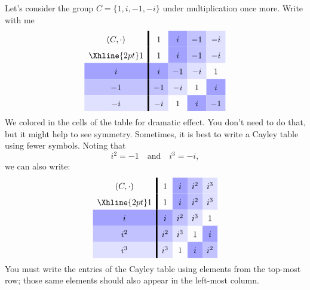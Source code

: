 \documentclass{ximera}
\begin{document}
\begin{example}
  Let's consider the group $C =\{1,i,-1,-i\}$ under multiplication once more.
  Write with me  
  \[
  \renewcommand{\arraystretch}{1.6}
  \begin{array}{c!{\vline width 2pt}cccccc}
    (C,\cdot)& 1     & i\cellcolor{blue!36!white}     & -1\cellcolor{blue!24!white}    & -i\cellcolor{blue!12!white}  \\  \Xhline{2pt}
    1        & 1     & i\cellcolor{blue!36!white}     & -1\cellcolor{blue!24!white}    & -i\cellcolor{blue!12!white}  \\  
    i\cellcolor{blue!36!white}        & i\cellcolor{blue!36!white}     & -1\cellcolor{blue!24!white}    & -i\cellcolor{blue!12!white}    & 1   \\  
    -1\cellcolor{blue!24!white}       & -1\cellcolor{blue!24!white}    & -i\cellcolor{blue!12!white}    & 1     & i\cellcolor{blue!36!white}   \\  
    -i\cellcolor{blue!12!white}       & -i\cellcolor{blue!12!white}    & 1     & i\cellcolor{blue!36!white}     & -1\cellcolor{blue!24!white}  
  \end{array}
  \]
  We colored in the cells of the table for dramatic effect. You don't
  need to do that, but it might help to see symmetry.  Sometimes, it
  is best to write a Cayley table using fewer symbols.  Noting that
  \[
  i^2 = -1 \quad\text{and}\quad i^3 = -i,
  \]
  we can also write:
  \[
  \renewcommand{\arraystretch}{1.6}
  \begin{array}{c!{\vline width 2pt}cccccc}
    (C,\cdot)& 1     & i\cellcolor{blue!36!white}     & i^2\cellcolor{blue!24!white}    & i^3\cellcolor{blue!12!white}  \\  \Xhline{2pt}
    1        & 1     & i\cellcolor{blue!36!white}     & i^2\cellcolor{blue!24!white}    & i^3\cellcolor{blue!12!white}  \\  
    i\cellcolor{blue!36!white}        & i\cellcolor{blue!36!white}     & i^2\cellcolor{blue!24!white}    & i^3\cellcolor{blue!12!white}    & 1   \\  
    i^2\cellcolor{blue!24!white}       & i^2\cellcolor{blue!24!white}    & i^3\cellcolor{blue!12!white}    & 1     & i\cellcolor{blue!36!white}   \\  
    i^3\cellcolor{blue!12!white}       & i^3\cellcolor{blue!12!white}    & 1     & i\cellcolor{blue!36!white}     & i^2\cellcolor{blue!24!white}  
  \end{array}
  \]
  You must write the entries of the Cayley table using elements from
  the top-most row; those same elements should also appear in the
  left-most column.
\end{example}
\end{document}
